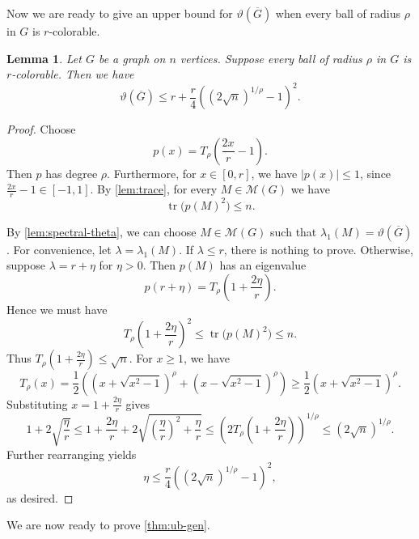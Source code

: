 \documentclass[10pt,a4paper]{amsart}
\newtheorem{lemma}[theorem]{Lemma}
\numberwithin{theorem}{section}
\renewcommand{\le}{\leqslant}
\renewcommand{\ge}{\geqslant}
\newcommand{\Tr}{\operatorname{tr}}
\newcommand{\ov}[1]{\overline{#1}}
\begin{document}
Now we are ready to give an upper bound for $\vartheta(\ov G)$ when every ball of radius $\rho$ in $G$ is $r$-colorable.

\begin{lemma}\label{lem:cheb}
Let $G$ be a graph on $n$ vertices. Suppose every ball of radius $\rho$ in $G$ is $r$-colorable. Then we have
\[
\vartheta(\ov G)\le r + \frac{r}{4}((2\sqrt{n})^{1/\rho}-1)^2.
\]
\end{lemma}

\begin{proof}
Choose
\[p(x)=T_\rho\left(\frac{2x}{r}-1\right).\]
Then $p$ has degree $\rho$. Furthermore, for $x\in[0,r]$, we have $|p(x)|\le 1$, since $\frac{2x}{r}-1\in[-1,1]$.
By \cref{lem:trace}, for every $M\in\mathcal M(G)$ we have
\[\Tr\bigl(p(M)^2\bigr)\le n.\]

By \cref{lem:spectral-theta}, we can choose $M\in\mathcal M(G)$ such that $\lambda_1(M)=\vartheta(\ov G)$. For convenience, let $\lambda=\lambda_1(M)$. If $\lambda\le r$, there is nothing to prove.  Otherwise, suppose $\lambda=r+\eta$ for $\eta > 0$. Then $p(M)$ has an eigenvalue
\[p(r+\eta)=T_\rho\left(1+\frac{2\eta}{r}\right).\]
Hence we must have
\[
T_\rho\left(1+\frac{2\eta}{r}\right)^2\le\Tr\bigl(p(M)^2\bigr)\le n.\]
Thus $T_\rho\left(1+\frac{2\eta}{r}\right)\le\sqrt{n}$.
For $x\ge 1$, we have 
\[T_\rho(x)=\frac{1}{2}\left(\left(x+\sqrt{x^2-1}\right)^\rho+\left(x-\sqrt{x^2-1}\right)^\rho\right)\ge \frac{1}{2}\left(x+\sqrt{x^2-1}\right)^\rho.\]
Substituting $x=1+\frac{2\eta}{r}$ gives
\[1+2\sqrt{\frac{\eta}{r}} \le 1+\frac{2\eta}{r}+2\sqrt{(\frac{\eta}{r})^2+\frac{\eta}{r}}\le \left(2T_\rho\left(1+\frac{2\eta}{r}\right)\right)^{1/\rho} \le(2\sqrt{n})^{1/\rho}.\]
Further rearranging yields
\[
\eta \le \frac{r}{4}((2\sqrt{n})^{1/\rho}-1)^2,
\]
as desired.
\end{proof}

We are now ready to prove \cref{thm:ub-gen}.
\end{document}
